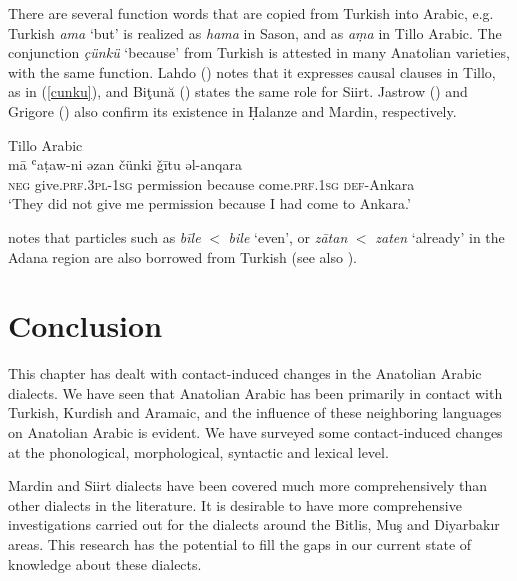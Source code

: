 \documentclass[output=paper]{langsci/langscibook}
\begin{document}
There are several function words that are copied from Turkish into Arabic, e.g. Turkish \textit{ama} `but' is realized as \textit{hama} in Sason, and as \textit{a\d{m}a} in Tillo Arabic. The conjunction \textit{\c{c}\"{u}nk\"{u}} `because' from Turkish is attested in many Anatolian varieties, with the same function. Lahdo (\citeyear[179]{Lahdo2009}) notes that it expresses causal clauses in Tillo, as in (\ref{cunku}), and Biţună  (\citeyear[213]{Bituna2016}) states the same role for Siirt. Jastrow (\citeyear[278]{Jastrow1981}) and Grigore (\citeyear[261]{Grigore2007book}) also confirm its existence in Ḥalanze and Mardin, respectively.

\begin{exe}
\ex Tillo Arabic \citep[179]{Lahdo2009}\\
\label{cunku} \gll m\={a} ʿa\d{t}aw-ni əzan \v{c}\"{u}nki \v{g}\={i}tu əl-anqara\\
\textsc{neg} give.\textsc{prf.3pl}-\textsc{1sg} permission because come.\textsc{prf.1sg} \textsc{def}-Ankara\\
\glt `They did not give me permission because I had come to Ankara.'
\end{exe}
 

\noindent \cite{Procházka2005} notes that particles such as \textit{b\={i}le} $<$ \textit{bile} `even', or \textit{z\={a}tan} $<$ \textit{zaten} `already' in the Adana region are also borrowed from Turkish (see also \citealt{Isaksson2005}). 




\section{Conclusion}

This chapter has dealt with contact-induced changes in the Anatolian Arabic dialects. We have seen that Anatolian Arabic has been primarily in contact with Turkish, Kurdish and Aramaic, and the influence of these neighboring languages on Anatolian Arabic is evident. We have surveyed some contact-induced changes at the phonological, morphological, syntactic and lexical level. %

Mardin and Siirt dialects have been covered much more comprehensively than other dialects in the literature. It is desirable to have more comprehensive investigations carried out for the dialects around the Bitlis, Mu\c{s} and Diyarbak{\i}r areas. This research has the potential to fill the gaps in our current state of knowledge about these dialects. 
\end{document}
